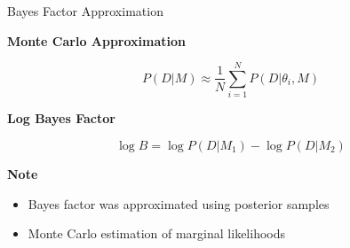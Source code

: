 \documentclass[aspectratio=169]{beamer}
\begin{document}
\begin{frame}{Bayes Factor Approximation}

\footnotesize

\textbf{Monte Carlo Approximation}

\begin{equation}
P(D|M) \approx \frac{1}{N}\sum_{i=1}^{N} P(D|\theta_i , M)
\end{equation}

\vspace{0.2cm}

\textbf{Log Bayes Factor}

\begin{equation}
\log B = \log P(D|M_1) - \log P(D|M_2)
\end{equation}

\vspace{0.3cm}

\textbf{Note}

\begin{itemize}

\item Bayes factor was approximated using posterior samples

\item Monte Carlo estimation of marginal likelihoods

\end{itemize}

\end{frame}
\end{document}
